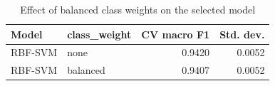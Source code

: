 \begin{table}[htbp]
\centering
\small
\caption{Effect of balanced class weights on the selected model}
\label{tab:class_weight}
\begin{tabular}{llrr}
\toprule
Model & class\_weight & CV macro F1 & Std. dev. \\
\midrule
RBF-SVM & none & 0.9420 & 0.0052 \\
RBF-SVM & balanced & 0.9407 & 0.0052 \\
\bottomrule
\end{tabular}
\end{table}
